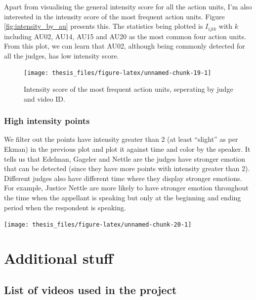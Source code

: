 \documentclass{monashthesis}
\begin{document}
Apart from visualising the general intensity score for all the action units, I'm also interested in the intensity score of the most frequent action units. Figure \ref{fig:intensity_by_au} presents this. The statistics being plotted is \(I_{ijtk}\) with \(k\) including AU02, AU14, AU15 and AU20 as the most common four action units. From this plot, we can learn that AU02, although being commonly detected for all the judges, has low intensity score.

\begin{figure}
\texttt{[image: thesis\_files/figure-latex/unnamed-chunk-19-1]} \caption{Intensity score of the most frequent action units, seperating by judge and video ID.\label{fig:intensity_by_au}}\label{fig:unnamed-chunk-19}
\end{figure}

\hypertarget{high-intensity-points}{%
\subsection{High intensity points}\label{high-intensity-points}}

We filter out the points have intensity greater than 2 (at least ``slight'' as per Ekman) in the previous plot and plot it against time and color by the speaker. It tells us that Edelman, Gageler and Nettle are the judges have stronger emotion that can be detected (since they have more points with intensity greater than 2). Different judges also have different time where they display stronger emotions. For example, Justice Nettle are more likely to have stronger emotion throughout the time when the appellant is speaking but only at the beginning and ending period when the respondent is speaking.

\texttt{[image: thesis\_files/figure-latex/unnamed-chunk-20-1]}

\appendix

\hypertarget{additional-stuff}{%
\chapter{Additional stuff}\label{additional-stuff}}

\hypertarget{list-of-videos-used-in-the-project}{%
\section{List of videos used in the project}\label{list-of-videos-used-in-the-project}}
\end{document}
